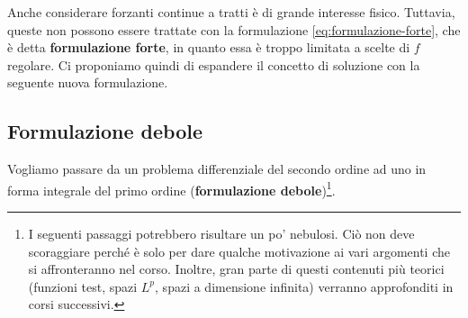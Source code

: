 \FloatBarrier
Anche considerare forzanti continue a tratti è di grande interesse fisico.
Tuttavia, queste non possono essere trattate con la formulazione \eqref{eq:formulazione-forte}, che è detta \textbf{formulazione forte}, in quanto essa è troppo limitata a scelte di $f$ regolare.
Ci proponiamo quindi di espandere il concetto di soluzione con la seguente nuova formulazione.
\subsection{Formulazione debole}
\label{sec:formulazione-debole}

Vogliamo passare da un problema differenziale del secondo ordine ad uno in forma integrale del primo ordine (\textbf{formulazione debole})\footnote{I seguenti passaggi potrebbero risultare un po' nebulosi.
Ciò non deve scoraggiare perché è solo per dare qualche motivazione ai vari argomenti che si affronteranno nel corso. Inoltre, gran parte di questi contenuti più teorici (funzioni test, spazi $L^{p}$, spazi a dimensione infinita) verranno approfonditi in corsi successivi.}.

